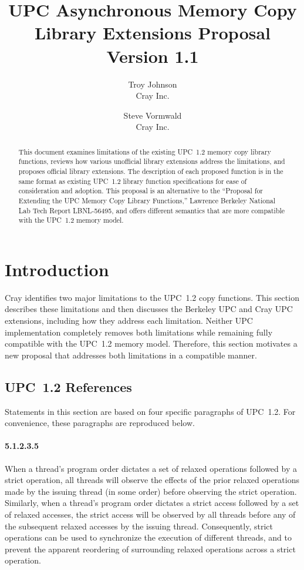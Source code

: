 \documentclass[10pt]{article}
\title{UPC Asynchronous Memory Copy Library Extensions Proposal\\Version 1.1}
\author{Troy Johnson\\Cray Inc. \and Steve Vormwald\\Cray Inc.}
\begin{document}
\maketitle

\begin{abstract}
This document examines limitations of the existing UPC~1.2 memory copy library
functions, reviews how various unofficial library extensions address the
limitations, and proposes official library extensions.  The description of each
proposed function is in the same format as existing UPC~1.2 library function
specifications for ease of consideration and adoption.  This proposal is an
alternative to the ``Proposal for Extending the UPC Memory Copy Library
Functions,'' Lawrence Berkeley National Lab Tech Report LBNL-56495, and offers
different semantics that are more compatible with the UPC~1.2 memory model.
\end{abstract}

\section{Introduction}

Cray identifies two major limitations to the UPC~1.2 copy functions.  This
section describes these limitations and then discusses the Berkeley UPC and Cray
UPC extensions, including how they address each limitation.  Neither UPC
implementation completely removes both limitations while remaining fully
compatible with the UPC~1.2 memory model.  Therefore, this section motivates a
new proposal that addresses both limitations in a compatible manner.

\subsection{UPC~1.2 References}

Statements in this section are based on four specific paragraphs of UPC~1.2.
For convenience, these paragraphs are reproduced below.

\paragraph{5.1.2.3.5} When a thread's program order dictates a set of relaxed
operations followed by a strict operation, all threads will observe the effects
of the prior relaxed operations made by the issuing thread (in some order)
before observing the strict operation. Similarly, when a thread's program order
dictates a strict access followed by a set of relaxed accesses, the strict
access will be observed by all threads before any of the subsequent relaxed
accesses by the issuing thread. Consequently, strict operations can be used to
synchronize the execution of different threads, and to prevent the apparent
reordering of surrounding relaxed operations across a strict operation.
\end{document}
